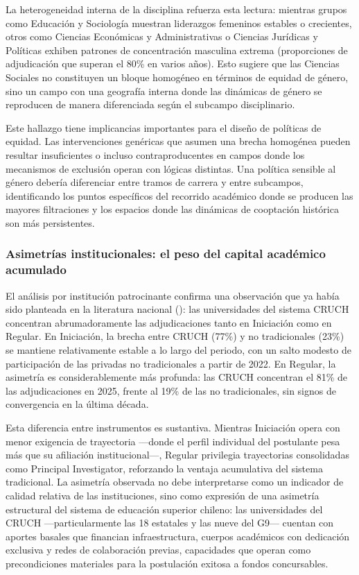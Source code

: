 \documentclass[
  12pt,
  letterpaper,
]{article}
\begin{document}
La heterogeneidad interna de la disciplina refuerza esta lectura:
mientras grupos como Educación y Sociología muestran liderazgos
femeninos estables o crecientes, otros como Ciencias Económicas y
Administrativas o Ciencias Jurídicas y Políticas exhiben patrones de
concentración masculina extrema (proporciones de adjudicación que
superan el 80\% en varios años). Esto sugiere que las Ciencias Sociales
no constituyen un bloque homogéneo en términos de equidad de género,
sino un campo con una geografía interna donde las dinámicas de género se
reproducen de manera diferenciada según el subcampo disciplinario.

Este hallazgo tiene implicancias importantes para el diseño de políticas
de equidad. Las intervenciones genéricas que asumen una brecha homogénea
pueden resultar insuficientes o incluso contraproducentes en campos
donde los mecanismos de exclusión operan con lógicas distintas. Una
política sensible al género debería diferenciar entre tramos de carrera
y entre subcampos, identificando los puntos específicos del recorrido
académico donde se producen las mayores filtraciones y los espacios
donde las dinámicas de cooptación histórica son más persistentes.

\subsubsection{Asimetrías institucionales: el peso del capital académico
acumulado}\label{asimetruxedas-institucionales-el-peso-del-capital-acaduxe9mico-acumulado}

El análisis por institución patrocinante confirma una observación que ya
había sido planteada en la literatura nacional
(): las
universidades del sistema CRUCH concentran abrumadoramente las
adjudicaciones tanto en Iniciación como en Regular. En Iniciación, la
brecha entre CRUCH (77\%) y no tradicionales (23\%) se mantiene
relativamente estable a lo largo del periodo, con un salto modesto de
participación de las privadas no tradicionales a partir de 2022. En
Regular, la asimetría es considerablemente más profunda: las CRUCH
concentran el 81\% de las adjudicaciones en 2025, frente al 19\% de las
no tradicionales, sin signos de convergencia en la última década.

Esta diferencia entre instrumentos es sustantiva. Mientras Iniciación
opera con menor exigencia de trayectoria ---donde el perfil individual
del postulante pesa más que su afiliación institucional---, Regular
privilegia trayectorias consolidadas como Principal Investigator,
reforzando la ventaja acumulativa del sistema tradicional. La asimetría
observada no debe interpretarse como un indicador de calidad relativa de
las instituciones, sino como expresión de una asimetría estructural del
sistema de educación superior chileno: las universidades del CRUCH
---particularmente las 18 estatales y las nueve del G9--- cuentan con
aportes basales que financian infraestructura, cuerpos académicos con
dedicación exclusiva y redes de colaboración previas, capacidades que
operan como precondiciones materiales para la postulación exitosa a
fondos concursables.
\end{document}

